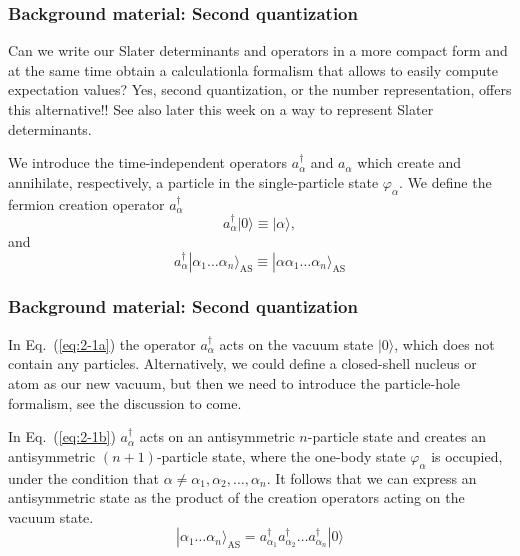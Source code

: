 \documentclass[compress]{beamer}
\newcommand*{\ket}[1]{|#1\rangle}
\begin{document}
\frame
{
  \frametitle{Background material: Second quantization}
\begin{small}
{\scriptsize
Can we write our Slater determinants and operators in a more compact form and at the same time obtain a 
calculationla formalism that allows to easily compute expectation values? Yes, second quantization, or the number representation, offers this alternative!! See also later this week on a way to represent Slater determinants.

We introduce the time-independent  operators
$a_\alpha^\dagger$ and $a_\alpha$   which create and annihilate, respectively, a particle 
in the single-particle state 
$\varphi_\alpha$. 
We define the fermion creation operator
$a_\alpha^\dagger$ 
\begin{equation}
	a_\alpha^{\dagger}\ket{0} \equiv  \ket{\alpha}  \label{eq:2-1a},
\end{equation}
and
\begin{equation}
	a_\alpha^{\dagger}\ket{\alpha_1\dots \alpha_n}_{\mathrm{AS}} \equiv  \ket{\alpha\alpha_1\dots \alpha_n}_{\mathrm{AS}} \label{eq:2-1b}
\end{equation}
}
\end{small}
}

\frame
{
  \frametitle{Background material: Second quantization}
\begin{small}
{\scriptsize
In Eq.~(\ref{eq:2-1a}) 
the operator  $a_\alpha^\dagger$  acts on the vacuum state 
$\ket{0}$, which does not contain any particles. Alternatively, we could define  a closed-shell nucleus or atom as our new vacuum, but then
we need to introduce the particle-hole  formalism, see the discussion to come. 

In Eq.~(\ref{eq:2-1b}) $a_\alpha^\dagger$ acts on an antisymmetric $n$-particle state and 
creates an antisymmetric $(n+1)$-particle state, where the one-body state 
$\varphi_\alpha$ is occupied, under the condition that
$\alpha \ne \alpha_1, \alpha_2, \dots, \alpha_n$. 
It follows that we can express an antisymmetric state as the product of the creation
operators acting on the vacuum state.  
\begin{equation}
	\ket{\alpha_1\dots \alpha_n}_{\mathrm{AS}} = a_{\alpha_1}^\dagger a_{\alpha_2}^\dagger \dots a_{\alpha_n}^\dagger \ket{0} \label{eq:2-2}
\end{equation}
}
\end{small}
}
\end{document}
